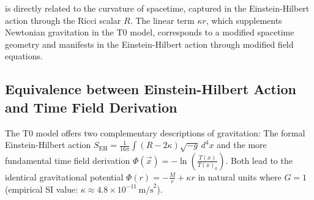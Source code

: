 \documentclass[12pt,a4paper]{article}
\newcommand{\Tfield}{T(x)}
\begin{document}
	is directly related to the curvature of spacetime, captured in the Einstein-Hilbert action through the Ricci scalar $R$. The linear term $\kappa r$, which supplements Newtonian gravitation in the T0 model, corresponds to a modified spacetime geometry and manifests in the Einstein-Hilbert action through modified field equations.
\subsection*{Equivalence between Einstein-Hilbert Action and Time Field Derivation}
The T0 model offers two complementary descriptions of gravitation: The formal Einstein-Hilbert action $S_{\mathrm{EH}} = \frac{1}{16\pi} \int (R - 2\kappa) \sqrt{-g} \, d^4x$ and the more fundamental time field derivation $\Phi(\vec{x}) = -\ln\left(\frac{\Tfield}{\Tfield_0}\right)$. Both lead to the identical gravitational potential $\Phi(r) = -\frac{M}{r} + \kappa r$ in natural units where \(G = 1\) (empirical SI value: \(\kappa \approx 4.8 \times 10^{-11} \, \text{m/s}^2\)).


	
\end{document}
